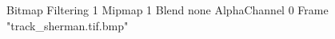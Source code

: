 {Bitmap
	{Filtering 1}
	{Mipmap 1}
	{Blend none}
	{AlphaChannel 0}
	{Frame "track_sherman.tif.bmp"}
}
